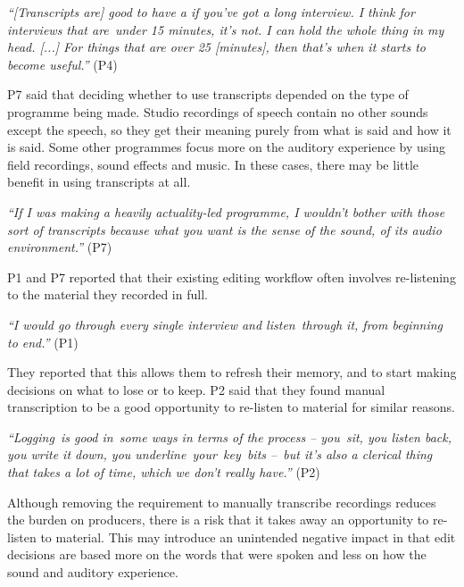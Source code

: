 \textit{``[Transcripts are] good to have a if you've got a long interview. I think for interviews that are under
  15 minutes, it's not. I can hold the whole thing in my head. [...] For things that are over 25 [minutes], then that's
when it starts to become useful.''} (P4)

P7 said that deciding whether to use transcripts depended on the type of programme being made. Studio recordings of
speech contain no other sounds except the speech, so they get their meaning purely from what is said and how it is
said. Some other programmes focus more on the auditory experience by using field recordings, sound effects and music.
In these cases, there may be little benefit in using transcripts at all.

\textit{``If I was making a heavily actuality-led programme, I wouldn't bother with those sort of transcripts because
what you want is the sense of the sound, of its audio environment.''} (P7)




P1 and P7 reported that their existing editing workflow often involves re-listening to the material they recorded in
full.

\textit{``I would go through every single interview and listen through it, from beginning to end.''} (P1)

They reported that this allows them to refresh their memory, and to start making decisions on what to lose or to keep.
P2 said that they found manual transcription to be a good opportunity to re-listen to material for similar
reasons.

\textit{``Logging is good in some ways in terms of the process -- you sit, you listen back, you write it down, you
underline your key bits -- but it's also a clerical thing that takes a lot of time, which we don't really have.''} (P2)

Although removing the requirement to manually transcribe recordings reduces the burden on producers, there is a risk
that it takes away an opportunity to re-listen to material. This may introduce an unintended negative impact in that
edit decisions are based more on the words that were spoken and less on how the sound and auditory experience.

